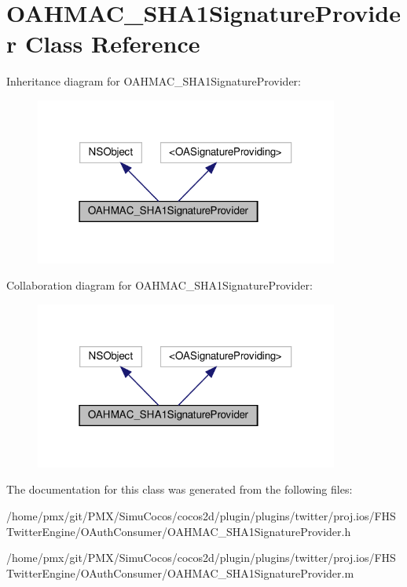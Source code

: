 \hypertarget{interfaceOAHMAC__SHA1SignatureProvider}{}\section{O\+A\+H\+M\+A\+C\+\_\+\+S\+H\+A1\+Signature\+Provider Class Reference}
\label{interfaceOAHMAC__SHA1SignatureProvider}


Inheritance diagram for O\+A\+H\+M\+A\+C\+\_\+\+S\+H\+A1\+Signature\+Provider\+:
\nopagebreak
\begin{figure}[H]
\begin{center}
\leavevmode
\includegraphics[width=283pt]{interfaceOAHMAC__SHA1SignatureProvider__inherit__graph}
\end{center}
\end{figure}


Collaboration diagram for O\+A\+H\+M\+A\+C\+\_\+\+S\+H\+A1\+Signature\+Provider\+:
\nopagebreak
\begin{figure}[H]
\begin{center}
\leavevmode
\includegraphics[width=283pt]{interfaceOAHMAC__SHA1SignatureProvider__coll__graph}
\end{center}
\end{figure}


The documentation for this class was generated from the following files\+:\begin{DoxyCompactItemize}
\item 
/home/pmx/git/\+P\+M\+X/\+Simu\+Cocos/cocos2d/plugin/plugins/twitter/proj.\+ios/\+F\+H\+S\+Twitter\+Engine/\+O\+Auth\+Consumer/O\+A\+H\+M\+A\+C\+\_\+\+S\+H\+A1\+Signature\+Provider.\+h\item 
/home/pmx/git/\+P\+M\+X/\+Simu\+Cocos/cocos2d/plugin/plugins/twitter/proj.\+ios/\+F\+H\+S\+Twitter\+Engine/\+O\+Auth\+Consumer/O\+A\+H\+M\+A\+C\+\_\+\+S\+H\+A1\+Signature\+Provider.\+m\end{DoxyCompactItemize}
